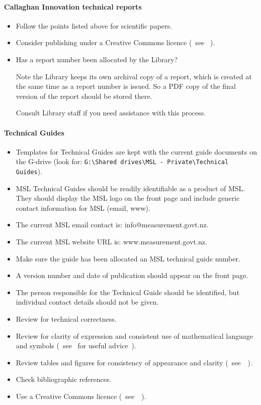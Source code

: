 \paragraph{Callaghan Innovation technical reports}
\begin{itemize}
\item  Follow the points listed above for scientific papers.
\item  Consider publishing under a Creative Commons licence (~see \cite[\S\ref*{GRP-s_copyright}]{MSL_Reporting_Guidelines}~).
\item  Has a report number been allocated by the Library? 

\vspace{\baselineskip}
Note the Library keeps its own archival copy of a report, which is created at the same time as a report number is issued. So a PDF copy of the final version of the report should be stored there. 

\vspace{\baselineskip}Consult Library staff if you need assistance with this process.
\end{itemize} 

\paragraph{Technical Guides}

\begin{itemize}
\item Templates for Technical Guides are kept with the current guide documents on the G-drive (look for: 
\verb|G:\Shared drives\MSL - Private\Technical Guides|).
\item MSL Technical Guides should be readily identifiable as a product of MSL. They should display the MSL logo on the front page and include generic contact information for MSL (email, www). 
\item  The current MSL email contact is: info@measurement.govt.nz.
\item  The current MSL website URL is: www.measurement.govt.nz.
\item  Make sure the guide has been allocated an MSL technical guide number.
\item  A version number and date of publication should appear on the front page.
\item  The person responsible for the Technical Guide should be identified, but individual contact details should not be given.
\item  Review for technical correctness.
\item  Review for clarity of expression and consistent use of mathematical language and symbols (~see~\cite[\S\ref*{GRP-s:scientific_documents}]{MSL_Reporting_Guidelines} for useful advice~).
\item  Review tables and figures for consistency of appearance and clarity (~see~\cite[\S\ref*{GRP-s:scientific_documents}]{MSL_Reporting_Guidelines}~).
\item  Check bibliographic references. 
\item  Use a Creative Commons licence (~see~\cite[\S\ref*{GRP-s_copyright}]{MSL_Reporting_Guidelines}~).
\end{itemize}


